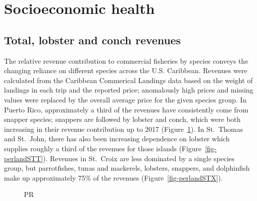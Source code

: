 \documentclass[
  letterpaper,
  oneside,
  open=any]{scrbook}
\begin{document}
\section{Socioeconomic health}\label{socioeconomic-health}

\subsection{Total, lobster and conch
revenues}\label{total-lobster-and-conch-revenues}

The relative revenue contribution to commercial fisheries by species
conveys the changing reliance on different species across the U.S.
Caribbean. Revenues were calculated from the Caribbean Commerical
Landings data based on the weight of landings in each trip and the
reported price; anomalously high prices and missing values were replaced
by the overall average price for the given species group. In Puerto
Rico, approximately a third of the revenues have consistently come from
snapper species; snappers are followed by lobster and conch, which were
both increasing in their revenue contribution up to 2017
(Figure~\ref{fig-perlandPR}). In St.~Thomas and St.~John, there has also
been increasing dependence on lobster which supplies roughly a third of
the revenues for those islands (Figure~\ref{fig-perlandSTT}). Revenues
in St.~Croix are less dominated by a single species group, but
parrotfishes, tunas and mackerels, lobsters, snappers, and dolphinfish
make up approximately 75\% of the revenues
(Figure~\ref{fig-perlandSTX}).

\begin{figure}


\caption{\label{fig-perlandPR}PR}

\end{figure}%
\end{document}
